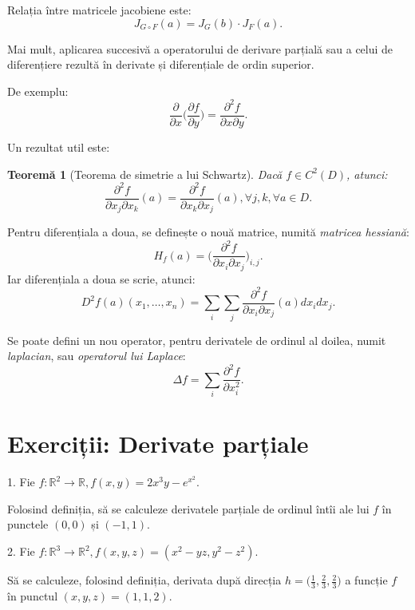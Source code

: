 \documentclass[11pt,a4paper]{article}
\newcommand\RR{\mathbb{R}}
\theoremstyle{dotless}
\newtheorem{theorem}{Teorem\u{a}}[section]
\theoremstyle{dotlessdr}
\begin{document}
Relația între matricele jacobiene este:
\[
  J_{G \circ F}(a) = J_G(b) \cdot J_F(a).
\]

Mai mult, aplicarea succesivă a operatorului de derivare parțială sau a celui de
diferențiere rezultă în derivate și diferențiale de ordin superior.

De exemplu:
\[
  \frac{\partial}{\partial x} \Big( \frac{\partial f}{\partial y} \Big) = %
  \frac{\partial^2 f}{\partial x \partial y}.
\]

Un rezultat util este:

\begin{theorem}[Teorema de simetrie a lui Schwartz]\label{thm:schwartz}
  Dacă $f \in C^2(D)$, atunci:
  \[
    \frac{\partial^2 f}{\partial x_j \partial x_k} (a) = %
    \frac{\partial^2 f}{\partial x_k \partial x_j} (a), \forall j, k, \forall a \in D.
  \]
\end{theorem}

Pentru diferențiala a doua, se definește o nouă matrice, numită \emph{matricea hessiană}:
\[
  H_f(a) = \Big( \frac{\partial^2 f}{\partial x_i \partial x_j} \Big)_{i, j}.
\]
Iar diferențiala a doua se scrie, atunci:
\[
  D^2f(a)(x_1, \dots, x_n) = \sum_i \sum_j \frac{\partial^2 f}{\partial x_i \partial x_j} (a) dx_i dx_j.
\]

Se poate defini un nou operator, pentru derivatele de ordinul al doilea, numit \emph{laplacian},
sau \emph{operatorul lui Laplace}:
\[
  \Delta f = \sum_i \frac{\partial^2 f}{\partial x_i^2}.
\]


\section{Exerciții: Derivate parțiale}
\label{sec:ex-dp}

1. Fie $f : \RR^2 \to \RR, f(x, y) = 2x^3y - e^{x^2}$.

Folosind definiția, să se calculeze derivatele parțiale de ordinul întîi ale lui $f$
în punctele $(0, 0)$ și $(-1, 1)$.

\vspace{1cm}

2. Fie $f : \RR^3 \to \RR^2, f(x, y, z) = (x^2 - yz, y^2 - z^2)$.

Să se calculeze, folosind definiția, derivata după direcția $h = \big( \frac{1}{3}, \frac{2}{3}, \frac{2}{3} \big)$
a funcție $f$ în punctul $(x, y, z) = (1, 1, 2)$.

\vspace{1cm}
\end{document}
